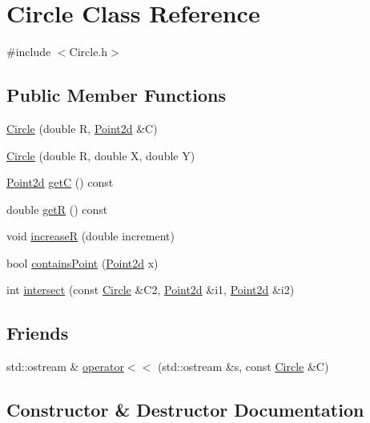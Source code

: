 \hypertarget{class_circle}{}\section{Circle Class Reference}
\label{class_circle}


{\ttfamily \#include $<$Circle.\+h$>$}

\subsection*{Public Member Functions}
\begin{DoxyCompactItemize}
\item 
\hyperlink{class_circle_a7b136937f096d73ff2f38ffabb052b5b}{Circle} (double R, \hyperlink{class_point2d}{Point2d} \&C)
\item 
\hyperlink{class_circle_a8745f76d4b164c4cc225a0710158eb4d}{Circle} (double R, double X, double Y)
\item 
\hyperlink{class_point2d}{Point2d} \hyperlink{class_circle_a3c261e77ada27aa079cc3b2a1b0101c8}{getC} () const
\item 
double \hyperlink{class_circle_a9a44a938e3d8df0b6ecb6f3f00a0878d}{getR} () const
\item 
void \hyperlink{class_circle_a74d675a63d50d899cfeda335ce13d161}{increaseR} (double increment)
\item 
bool \hyperlink{class_circle_a86a55c904fcda3dcb44e503894007aa1}{contains\+Point} (\hyperlink{class_point2d}{Point2d} x)
\item 
int \hyperlink{class_circle_aef8608916a5c51ec2de281eccb5276dc}{intersect} (const \hyperlink{class_circle}{Circle} \&C2, \hyperlink{class_point2d}{Point2d} \&i1, \hyperlink{class_point2d}{Point2d} \&i2)
\end{DoxyCompactItemize}
\subsection*{Friends}
\begin{DoxyCompactItemize}
\item 
std\+::ostream \& \hyperlink{class_circle_a3f0511cf13a23beca631b23f41b491b5}{operator$<$$<$} (std\+::ostream \&s, const \hyperlink{class_circle}{Circle} \&C)
\end{DoxyCompactItemize}


\subsection{Constructor \& Destructor Documentation}
\mbox{\label{class_circle_a7b136937f096d73ff2f38ffabb052b5b}} 
